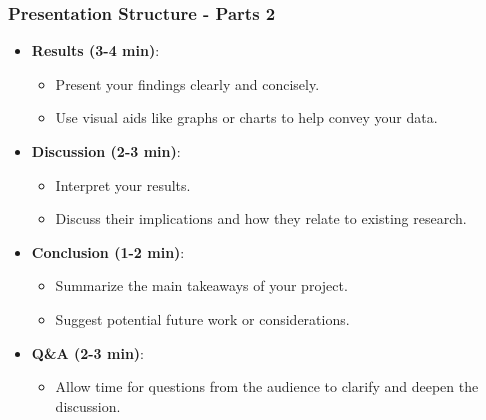 \documentclass[aspectratio=169]{beamer}
\begin{document}
\begin{frame}[fragile]
    \frametitle{Presentation Structure - Parts 2}
    \begin{itemize}
        \item \textbf{Results (3-4 min)}: 
        \begin{itemize}
            \item Present your findings clearly and concisely.
            \item Use visual aids like graphs or charts to help convey your data.
        \end{itemize}

        \item \textbf{Discussion (2-3 min)}:
        \begin{itemize}
            \item Interpret your results.
            \item Discuss their implications and how they relate to existing research.
        \end{itemize}

        \item \textbf{Conclusion (1-2 min)}:
        \begin{itemize}
            \item Summarize the main takeaways of your project.
            \item Suggest potential future work or considerations.
        \end{itemize}

        \item \textbf{Q\&A (2-3 min)}: 
        \begin{itemize}
            \item Allow time for questions from the audience to clarify and deepen the discussion.
        \end{itemize}
    \end{itemize}
\end{frame}
\end{document}
